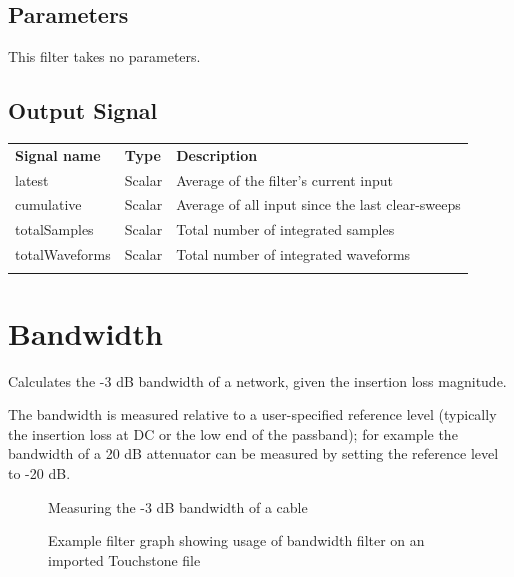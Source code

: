 \subsection{Parameters}

This filter takes no parameters.

\subsection{Output Signal}

\begin{tabularx}{16cm}{llX}
\thickhline
\textbf{Signal name} & \textbf{Type} & \textbf{Description} \\
\thickhline
latest & Scalar & Average of the filter's current input \\
\thinhline
cumulative & Scalar & Average of all input since the last clear-sweeps\\
\thinhline
totalSamples & Scalar & Total number of integrated samples \\
\thinhline
totalWaveforms & Scalar & Total number of integrated waveforms \\
\thickhline
\end{tabularx}

\pagebreak
\section{Bandwidth}

Calculates the -3 dB bandwidth of a network, given the insertion loss magnitude.

The bandwidth is measured relative to a user-specified reference level (typically the insertion loss at DC or the low
end of the passband); for example the bandwidth of a 20 dB attenuator can be measured by setting the reference level to
-20 dB.

\begin{figure}[h]
\centering
{}
\caption{Measuring the -3 dB bandwidth of a cable}
\label{filter_bandwidth}
\end{figure}

\begin{figure}[h]
\centering
{}
\caption{Example filter graph showing usage of bandwidth filter on an imported Touchstone file}
\label{filter_graph_bandwidth}
\end{figure}
\FloatBarrier

